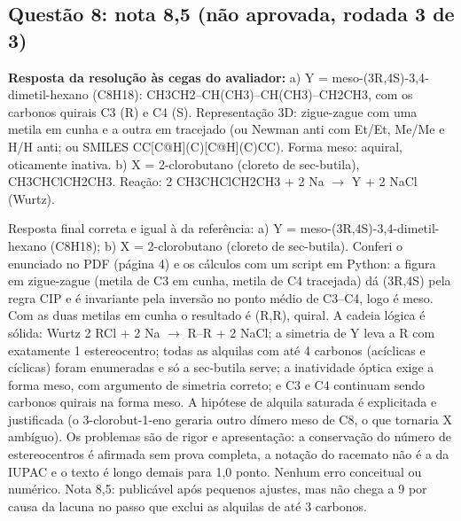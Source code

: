 \documentclass{article}%
\begin{document}
\subsection*{Questão 8: nota 8,5 (não aprovada, rodada 3 de 3)}%
\textbf{Resposta da resolução às cegas do avaliador:} a) Y = meso{-}(3R,4S){-}3,4{-}dimetil{-}hexano (C8H18): CH3CH2--CH(CH3)--CH(CH3)--CH2CH3, com os carbonos quirais C3 (R) e C4 (S). Representação 3D: zigue{-}zague com uma metila em cunha e a outra em tracejado (ou Newman anti com Et/Et, Me/Me e H/H anti; ou SMILES CC{[}C@H{]}(C){[}C@H{]}(C)CC). Forma meso: aquiral, oticamente inativa.\newline%
\newline%
b) X = 2{-}clorobutano (cloreto de sec{-}butila), CH3CHClCH2CH3. Reação: 2 CH3CHClCH2CH3 + 2 Na $\to$ Y + 2 NaCl (Wurtz).\par %
Resposta final correta e igual à da referência: a) Y = meso{-}(3R,4S){-}3,4{-}dimetil{-}hexano (C8H18); b) X = 2{-}clorobutano (cloreto de sec{-}butila). Conferi o enunciado no PDF (página 4) e os cálculos com um script em Python: a figura em zigue{-}zague (metila de C3 em cunha, metila de C4 tracejada) dá (3R,4S) pela regra CIP e é invariante pela inversão no ponto médio de C3--C4, logo é meso. Com as duas metilas em cunha o resultado é (R,R), quiral. A cadeia lógica é sólida: Wurtz 2 RCl + 2 Na $\to$ R--R + 2 NaCl; a simetria de Y leva a R com exatamente 1 estereocentro; todas as alquilas com até 4 carbonos (acíclicas e cíclicas) foram enumeradas e só a sec{-}butila serve; a inatividade óptica exige a forma meso, com argumento de simetria correto; e C3 e C4 continuam sendo carbonos quirais na forma meso. A hipótese de alquila saturada é explicitada e justificada (o 3{-}clorobut{-}1{-}eno geraria outro dímero meso de C8, o que tornaria X ambíguo). Os problemas são de rigor e apresentação: a conservação do número de estereocentros é afirmada sem prova completa, a notação do racemato não é a da IUPAC e o texto é longo demais para 1,0 ponto. Nenhum erro conceitual ou numérico. Nota 8,5: publicável após pequenos ajustes, mas não chega a 9 por causa da lacuna no passo que exclui as alquilas de até 3 carbonos.%
\end{document}
